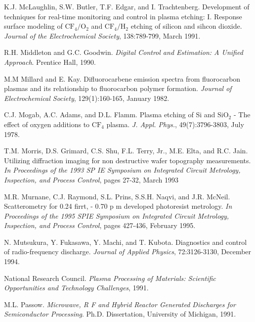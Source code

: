 \begin{thebibliography}{100}
	 K.J. McLaughlin, S.W. Butler, T.F. Edgar, and I. Trachtenberg. Development of techniques for real-time monitoring and control in plasma etching: I. Response surface modeling of $\text{CF}_{4}/\text{O}_{2}$ and $\text{CF}_{4}/\text{H}_{2}$ etching of silicon and sihcon dioxide. \emph{Journal of the Electrochemical Society}, 138:789-799, March 1991.

	
	 R.H. Middleton and G.C. Goodwin. \emph{Digital Control and Estimation: A Unified Approach}. Prentice Hall, 1990.
	
	 M.M Millard and E. Kay. Difluorocarbene emission spectra from fluorocarbon plasmas and its relationship to fluorocarbon polymer formation. \emph{Journal of Electrochemical Society}, 129(1):160-165, January 1982.

	
	 C.J. Mogab, A.C. Adams, and D.L. Flamm. Plasma etching of Si and $\text{SiO}_{2}$ - The effect of oxygen additions to $\text{CF}_{4}$ plasma. \emph{J. Appl. Phys.}, 49(7):3796-3803, July 1978.
	
	 T.M. Morris, D.S. Grimard, C.S. Shu, F.L. Terry, Jr., M.E. Elta, and R.C. Jain. Utilizing diffraction imaging for non destructive wafer topography measurements. \emph{In Proceedings of the 1993 SP IE Symposium on Integrated Circuit Metrology, Inspection, and Process Control}, pages 27-32, March 1993
	
	 M.R. Murnane, C.J. Raymond, S.L. Prins, S.S.H. Naqvi, and J.R. McNeil. Scatterometry for 0.24 firrt, - 0.70 p m developed photoresist metrology. \emph{In Proceedings of the 1995 SPIE Symposium on Integrated Circuit Metrology, Inspection, and Process Control}, pages 427-436, February 1995.
	
	 N. Mutsukura, Y. Fukasawa, Y. Machi, and T. Kubota. Diagnostics and control of radio-frequency discharge. \emph{Journal of Applied Physics}, 72:3126-3130, December 1994.
	
	 National Research Council. \emph{Plasma Processing of Materials: Scientific Opportunities and Technology Challenges}, 1991.
	
	 M.L. Passow. \emph{Microwave, R F and Hybrid Reactor Generated Discharges for Semiconductor Processing}. Ph.D. Dissertation, University of Michigan, 1991.
	

\end{thebibliography}
